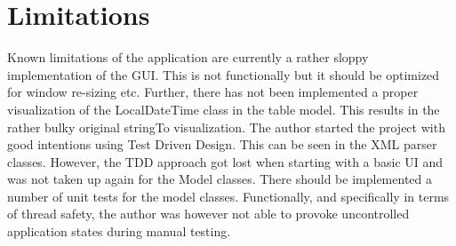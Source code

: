 \documentclass[a4paper,11pt,twoside]{article}
\begin{document}
\section{Limitations}
Known limitations of the application are currently a rather sloppy implementation of the GUI. This is not functionally but it should be optimized for window re-sizing etc. Further, there has not been implemented a proper visualization of the LocalDateTime class in the table model. This results in the rather bulky original stringTo visualization.
The author started the project with good intentions using Test Driven Design. This can be seen in the XML parser classes. However, the TDD approach got lost when starting with a basic UI and was not taken up again for the Model classes. There should be implemented a number of unit tests for the model classes.  
Functionally, and specifically in terms of thread safety, the author was however not able to provoke uncontrolled application states during manual testing.


\end{document}

